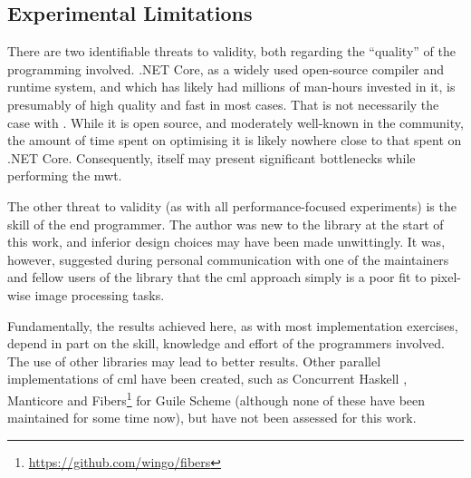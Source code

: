 \subsection{Experimental Limitations}
There are two identifiable threats to validity, both regarding the ``quality'' of the programming involved.  .NET Core, as a widely used open-source compiler and runtime system, and which has likely had millions of man-hours invested in it, is presumably of high quality and fast in most cases.  That is not necessarily the case with \hopac{}.  While it is open source, and moderately well-known in the \fsharp{} community, the amount of time spent on optimising it is likely nowhere close to that spent on .NET Core.  Consequently, \hopac{} itself may present significant bottlenecks while performing the \gls{mwt}.

The other threat to validity (as with all performance-focused experiments) is the skill of the end programmer.  The author was new to the \hopac{} library at the start of this work, and inferior design choices may have been made unwittingly.  It was, however, suggested during personal communication with one of the maintainers and fellow users of the \hopac{} library that the \gls{cml} approach simply is a poor fit to pixel-wise image processing tasks.

Fundamentally, the results achieved here, as with most implementation exercises, depend in part on the skill, knowledge and effort of the programmers involved.  The use of other libraries may lead to better results.  Other parallel implementations of \gls{cml} have been created, such as Concurrent Haskell \cite{Chaudhuri2009}, Manticore \cite{Reppy2009a} and Fibers\footnote{\url{https://github.com/wingo/fibers}} for Guile Scheme (although none of these have been maintained for some time now), but have not been assessed for this work.